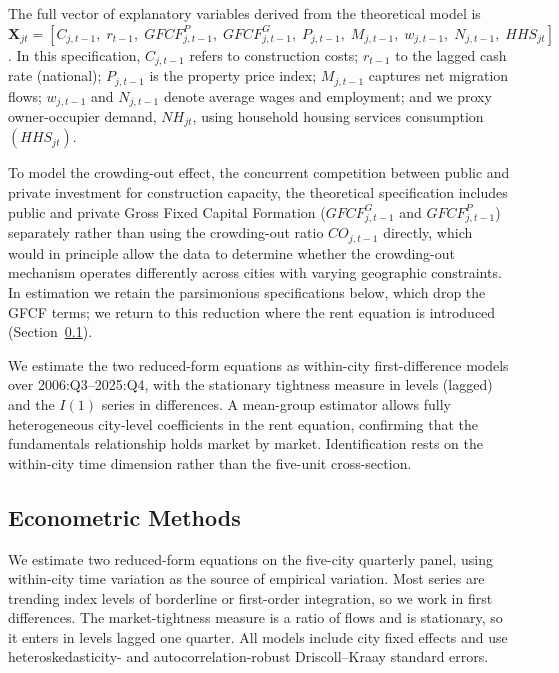 \documentclass[preprint,11pt,authoryear]{elsarticle}
\begin{document}
The full vector of explanatory variables derived from the theoretical model
is
$\mathbf{X}_{jt} = [C_{j,t-1},\; r_{t-1},\; GFCF^{P}_{j,t-1},\;
GFCF^{G}_{j,t-1},\; P_{j,t-1},\; M_{j,t-1},\; w_{j,t-1},\;
N_{j,t-1},\; HHS_{jt}]$. In this specification, $C_{j,t-1}$ refers to
construction costs; $r_{t-1}$ to the lagged cash rate (national);
$P_{j,t-1}$ is the property price index; $M_{j,t-1}$ captures net
migration flows; $w_{j,t-1}$ and $N_{j,t-1}$ denote average wages and
employment; and we proxy  owner-occupier demand, $NH_{jt}$, using household housing services consumption $(HHS_{jt})$.

To model the crowding-out effect, the concurrent competition between
public and private investment for construction capacity, the theoretical
specification includes public and private Gross Fixed Capital Formation
($GFCF^{G}_{j,t-1}$ and $GFCF^{P}_{j,t-1}$) separately rather than using
the crowding-out ratio $CO_{j,t-1}$ directly, which would in principle
allow the data to determine whether the crowding-out mechanism operates
differently across cities with varying geographic constraints. In
estimation we retain the parsimonious specifications below, which drop
the GFCF terms; we return to this reduction where the rent equation is
introduced (Section~\ref{sec:methods}).

We estimate the two reduced-form equations as within-city
first-difference models over 2006:Q3--2025:Q4, with the stationary
tightness measure in levels (lagged) and the $I(1)$ series in
differences. A mean-group estimator allows fully heterogeneous
city-level coefficients in the rent equation, confirming that the
fundamentals relationship holds market by market. Identification rests
on the within-city time dimension rather than the five-unit
cross-section.

\subsection{Econometric Methods}
\label{sec:methods}

We estimate two reduced-form equations on the five-city quarterly panel,
using within-city time variation as the source of empirical variation.
Most series are trending index levels of borderline or first-order
integration, so we work in first differences. The market-tightness
measure is a ratio of flows and is stationary, so it enters in levels
lagged one quarter. All models include city fixed effects and use
heteroskedasticity- and autocorrelation-robust Driscoll--Kraay standard
errors.
\end{document}
